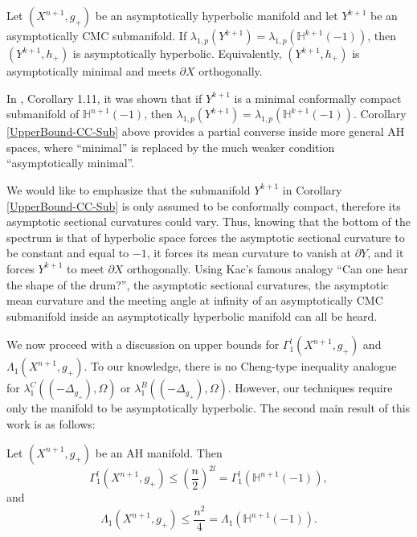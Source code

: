 \documentclass{amsart}
\newcommand{\Hyp}{\mathbb{H}^{n+1}(-1)}
\begin{document}
\begin{corollary}\label{UpperBound-CC-Sub}
    Let $(X^{n+1},g_+)$ be an asymptotically hyperbolic manifold and let $Y^{k+1}$ be an asymptotically CMC submanifold. If $\lambda_{1,p}(Y^{k+1}) = \lambda_{1,p}(\mathbb{H}^{k+1}(-1))$, then $(Y^{k+1},h_+)$ is asymptotically hyperbolic. Equivalently, $(Y^{k+1},h_+)$ is asymptotically minimal and meets $\partial X$ orthogonally. 
\end{corollary}
\begin{remark}
In \cite{PerezAyalaTyrrell}, Corollary 1.11, it was shown that if $Y^{k+1}$ is a minimal conformally compact submanifold of $\Hyp$, then $\lambda_{1,p}(Y^{k+1}) = \lambda_{1,p}(\mathbb{H}^{k+1}(-1))$. Corollary \ref{UpperBound-CC-Sub} above provides a partial converse inside more general AH spaces, where ``minimal'' is replaced by the much weaker condition ``asymptotically minimal''.
\end{remark}
We would like to emphasize that the submanifold $Y^{k+1}$ in Corollary \ref{UpperBound-CC-Sub} is only assumed to be conformally compact, therefore its asymptotic sectional curvatures could vary. Thus, knowing that the bottom of the spectrum is that of hyperbolic space forces the asymptotic sectional curvature to be constant and equal to $-1$, it forces its mean curvature to vanish at $\partial Y$, and it forces $Y^{k+1}$ to meet $\partial X$ orthogonally. Using Kac's famous analogy \cite{KacMark1966COHt} ``Can one hear the shape of the drum?'', the asymptotic sectional curvatures, the asymptotic mean curvature and the meeting angle at infinity of an asymptotically CMC submanifold inside an asymptotically hyperbolic manifold can all be heard. 

We now proceed with a discussion on upper bounds for $\Gamma^l_1(X^{n+1},g_+)$ and $\Lambda_1(X^{n+1},g_+)$. To our knowledge, there is no Cheng-type inequality analogue for $\lambda_1^C((-\Delta_{g_+}),\Omega)$ or $\lambda_1^B((-\Delta_{g_+}),\Omega)$. However, our techniques require only the manifold to be asymptotically hyperbolic. The second main result of this work is as follows:

\begin{theorem}\label{Sharp-UpperBounds}
    Let $(X^{n+1},g_+)$ be an AH manifold. Then
    \begin{equation}\label{Sharp-UB-Clamped}
        \Gamma^l_1(X^{n+1},g_+)\le \left(\frac{n}{2}\right)^{2l} = \Gamma^l_1(\mathbb{H}^{n+1}(-1)),
    \end{equation}
    and 
    \begin{equation}\label{Sharp-UB-Buckling}
        \Lambda_1(X^{n+1},g_+)\le \frac{n^2}{4} = \Lambda_1(\mathbb{H}^{n+1}(-1)).
    \end{equation}
\end{theorem}
\end{document}
